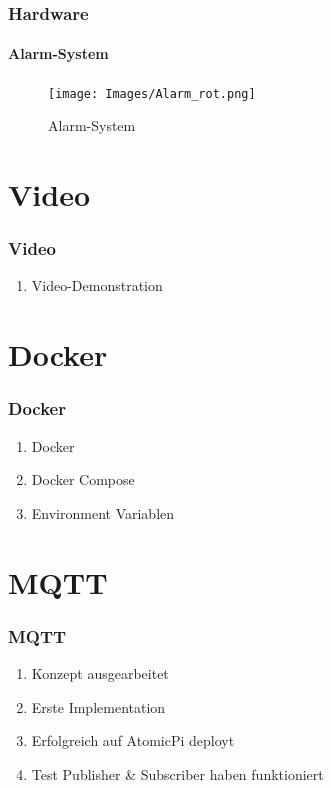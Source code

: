 \documentclass[]{beamer}
\begin{document}
\begin{frame}
	\frametitle{Hardware}
	\framesubtitle{Alarm-System}
	\begin{figure}
		\centering
		\begin{minipage}[t]{1\textwidth}
			\centering
			\texttt{[image: Images/Alarm\_rot.png]}
		\end{minipage}
		\caption{Alarm-System}
		\label{fig:slarm_system}
	\end{figure}
\end{frame}

\section{Video}

\begin{frame}
	\frametitle{Video}
	\begin{enumerate}
		\item Video-Demonstration
	\end{enumerate}
\end{frame}


\section{Docker}
\begin{frame}
	\frametitle{Docker}
	\begin{enumerate}
		\item Docker 
		\item Docker Compose
		\item Environment Variablen
	\end{enumerate}
\end{frame}


\section{MQTT}
\begin{frame}
	\frametitle{MQTT}

	\begin{enumerate}
		\item Konzept ausgearbeitet
		\item Erste Implementation
		\item Erfolgreich auf AtomicPi deployt
		\item Test Publisher \& Subscriber haben funktioniert
	\end{enumerate}
\end{frame}
\end{document}

